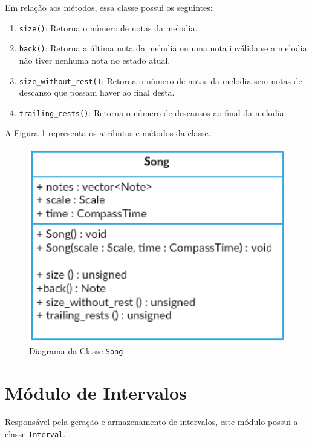       Em relação aos métodos, essa classe possui os seguintes:

      \begin{enumerate}
        \item \texttt{size()}: Retorna o número de notas da melodia.
        \item \texttt{back()}: Retorna a última nota da melodia ou uma nota inválida se a melodia não tiver nenhuma nota no estado atual.
        \item \texttt{size\_without\_rest()}: Retorna o número de notas da melodia sem notas de descanso que possam haver ao final desta.
        \item \texttt{trailing\_rests()}: Retorna o número de descansos ao final da melodia.

      \end{enumerate}

      A Figura \ref{songclass} representa os atributos e métodos da classe.

      \begin{figure}[htb]
        \centering
        \includegraphics[scale=0.7]{figuras/songclass.eps}
        \caption{Diagrama da Classe \texttt{Song}}
        \label{songclass}
      \end{figure}

  \section[Módulo de Intervalos]{Módulo de Intervalos}

    Responsável pela geração e armazenamento de intervalos, este módulo possui a classe \texttt{Interval}.


